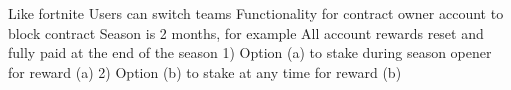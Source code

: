 Like fortnite Users can switch teams Functionality for contract owner account to block contract Season is 2 months, for example All account rewards reset and fully paid at the end of the season 1) Option (a) to stake during season opener for reward (a) 2) Option (b) to stake at any time for reward (b) 